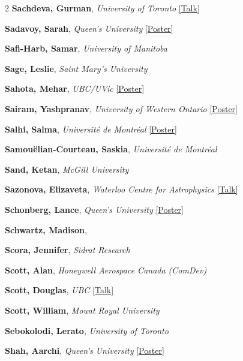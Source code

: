 \begin{small}
\begin{multicols}{2}
\textbf{Sachdeva, Gurman}, {\footnotesize\textit{University of Toronto}} \hyperref[abstract-page-talk-304]{\scriptsize\textcolor{cascablue}{[Talk]}}\par
\textbf{Sadavoy, Sarah}, {\footnotesize\textit{Queen's University}} \hyperref[poster-abstract-page-talk-119]{\scriptsize\textcolor{cascateal}{[Poster]}}\par
\textbf{Safi-Harb, Samar}, {\footnotesize\textit{University of Manitoba}}\par
\textbf{Sage, Leslie}, {\footnotesize\textit{Saint Mary's University}}\par
\textbf{Sahota, Mehar}, {\footnotesize\textit{UBC/UVic}} \hyperref[poster-abstract-page-talk-205]{\scriptsize\textcolor{cascateal}{[Poster]}}\par
\textbf{Sairam, Yashpranav}, {\footnotesize\textit{University of Western Ontario}} \hyperref[poster-abstract-page-talk-139]{\scriptsize\textcolor{cascateal}{[Poster]}}\par
\textbf{Salhi, Salma}, {\footnotesize\textit{Université de Montréal}} \hyperref[poster-abstract-page-talk-138]{\scriptsize\textcolor{cascateal}{[Poster]}}\par
\textbf{Samouëlian-Courteau, Saskia}, {\footnotesize\textit{Université de Montréal}}\par
\textbf{Sand, Ketan}, {\footnotesize\textit{McGill University}}\par
\textbf{Sazonova, Elizaveta}, {\footnotesize\textit{Waterloo Centre for Astrophysics}} \hyperref[abstract-page-talk-203]{\scriptsize\textcolor{cascablue}{[Talk]}}\par
\textbf{Schonberg, Lance}, {\footnotesize\textit{Queen's University}} \hyperref[poster-abstract-page-talk-48]{\scriptsize\textcolor{cascateal}{[Poster]}}\par
\textbf{Schwartz, Madison}, \par
\textbf{Scora, Jennifer}, {\footnotesize\textit{Sidrat Research}}\par
\textbf{Scott, Alan}, {\footnotesize\textit{Honeywell Aerospace Canada (ComDev)}}\par
\textbf{Scott, Douglas}, {\footnotesize\textit{UBC}} \hyperref[abstract-page-talk-156]{\scriptsize\textcolor{cascablue}{[Talk]}}\par
\textbf{Scott, William}, {\footnotesize\textit{Mount Royal University}}\par
\textbf{Sebokolodi, Lerato}, {\footnotesize\textit{University of Toronto}}\par
\textbf{Shah, Aarchi}, {\footnotesize\textit{Queen's University}} \hyperref[poster-abstract-page-talk-83]{\scriptsize\textcolor{cascateal}{[Poster]}}\par

\end{multicols}
\end{small}
